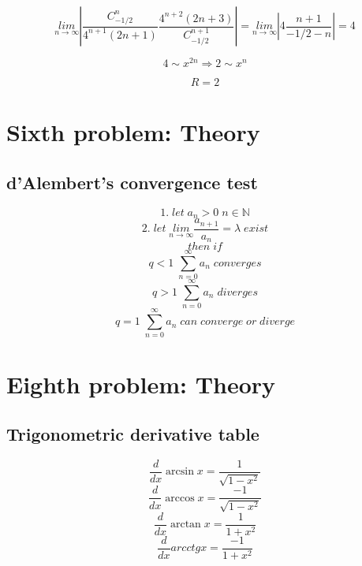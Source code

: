 \documentclass{article}
\begin{document}
\begin{equation*}
    \underset{n \rightarrow \infty}{lim} | \frac{C_{-1/2}^{n}}{4^{n+1}(2n+1)} \frac{4^{n+2}(2n+3)}{C_{-1/2}^{n+1}}| = \underset{n \rightarrow \infty}{lim} | 4 \frac{n+1}{-1/2-n} | = 4
\end{equation*}

\begin{equation*}
    4 \sim x^{2n} \Rightarrow 2 \sim x^n
\end{equation*}

\begin{equation}
    R = 2
\end{equation}


\newpage
\section{Sixth problem: Theory}

\hypertarget{6.1}{}
\subsection{d'Alembert's convergence test}
\begin{equation*}
    1. \; let \; a_n>0 \; n \in \mathbb N
\end{equation*}
\begin{equation*}
    2. \; let \; \underset{n \rightarrow \infty}{lim} \frac{a_{n+1}}{a_n} = \lambda \; exist
\end{equation*}
\begin{equation*}
    then \; if
\end{equation*}
\begin{equation*}
    q<1 \; \sum_{n=0}^{\infty} a_n \; converges
\end{equation*}
\begin{equation*}
    q>1 \; \sum_{n=0}^{\infty} a_n \; diverges
\end{equation*}
\begin{equation*}
    q=1 \; \sum_{n=0}^{\infty} a_n \; can \; converge \; or \; diverge
\end{equation*}


\newpage
\section{Eighth problem: Theory}

\hypertarget{8.1}{}
\subsection{Trigonometric derivative table}
\begin{equation*}
    \frac{d}{dx}\arcsin x = \frac{1}{\sqrt{1-x^2}}
\end{equation*}
\begin{equation*}
    \frac{d}{dx}\arccos x = \frac{-1}{\sqrt{1-x^2}}
\end{equation*}
\begin{equation*}
    \frac{d}{dx} \arctan x = \frac{1}{1+x^2}
\end{equation*}
\begin{equation*}
    \frac{d}{dx} arcctg x = \frac{-1}{1+x^2}
\end{equation*}
\end{document}
